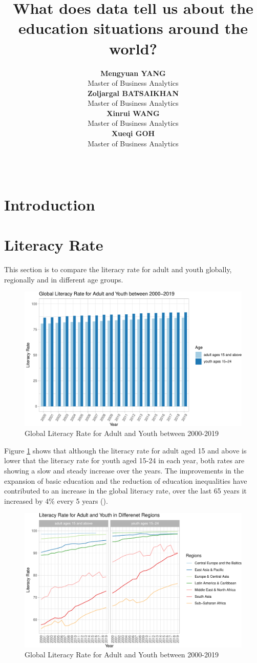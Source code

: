 \documentclass[11pt,a4paper,]{article}
\title{What does data tell us about the education situations around the world?}
\author{\sf\Large\textbf{ Mengyuan YANG}\\ {\sf\large Master of Business Analytics\\[0.5cm]} \sf\Large\textbf{ Zoljargal BATSAIKHAN}\\ {\sf\large Master of Business Analytics\\[0.5cm]} \sf\Large\textbf{ Xinrui WANG}\\ {\sf\large Master of Business Analytics\\[0.5cm]} \sf\Large\textbf{ Xueqi GOH}\\ {\sf\large Master of Business Analytics\\[0.5cm]}}
\date{\sf\Date~\Month~\Year}
\makeatletter
\def\titlepage{\front{\expandafter{\@title}}{\@author}{\@organization}}
\makeatother
\begin{document}
\titlepage

{
\setcounter{tocdepth}{2}
\tableofcontents
}
\section*{Introduction}

\section*{Literacy Rate}

This section is to compare the literacy rate for adult and youth globally, regionally and in different age groups.

\begin{figure}[H]
\includegraphics[width=0.9\linewidth,]{report_files/figure-latex/world-my-1} \caption{Global Literacy Rate for Adult and Youth between 2000-2019}\label{fig:world-my}
\end{figure}

Figure \ref{fig:world-my} shows that although the literacy rate for adult aged 15 and above is lower that the literacy rate for youth aged 15-24 in each year, both rates are showing a slow and steady increase over the years. The improvements in the expansion of basic education and the reduction of education inequalities have contributed to an increase in the global literacy rate, over the last 65 years it increased by 4\% every 5 years (\textcite{owidliteracy}).

\begin{figure}[H]
\includegraphics[width=0.9\linewidth,]{report_files/figure-latex/regions-my-1} \caption{Global Literacy Rate for Adult and Youth between 2000-2019}\label{fig:regions-my}
\end{figure}
\end{document}

